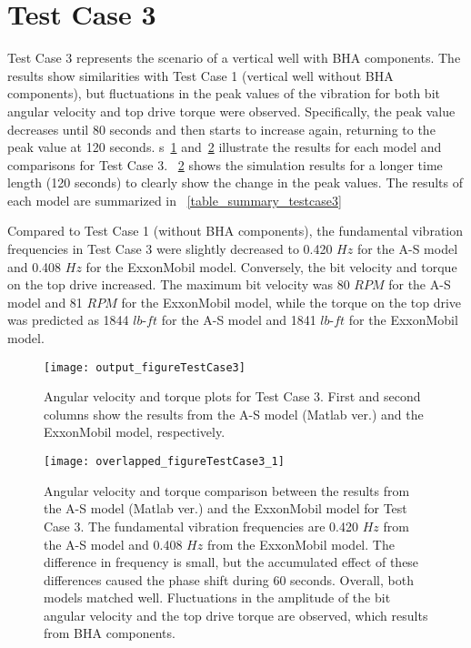 \section{Test Case 3}
 Test Case 3 represents the scenario of a vertical well with BHA components. The results show similarities with Test Case 1 (vertical well without BHA components), but fluctuations in the peak values of the vibration for both bit angular velocity and top drive torque were observed. Specifically, the peak value decreases until 80 seconds and then starts to increase again, returning to the peak value at 120 seconds. \figurename{}s~\ref{figure_testcase3} and~\ref{figure_testcase3_overlapped} illustrate the results for each model and comparisons for Test Case 3. \figurename~\ref{figure_testcase3_overlapped} shows the simulation results for a longer time length (120 seconds) to clearly show the change in the peak values. The results of each model are summarized in \tablename~\ref{table_summary_testcase3}

Compared to Test Case 1 (without BHA components), the fundamental vibration frequencies in Test Case 3 were slightly decreased to 0.420 $Hz$ for the A-S model and 0.408 $Hz$ for the ExxonMobil model. Conversely, the bit velocity and torque on the top drive increased. The maximum bit velocity was 80 $RPM$ for the A-S model and 81 $RPM$ for the ExxonMobil model, while the torque on the top drive was predicted as 1844 $lb\mbox{-}ft$ for the A-S model and 1841 $lb\mbox{-}ft$ for the ExxonMobil model.

\begin{figure}
  \centering
  \texttt{[image: output\_figureTestCase3]}
  \caption[Angular velocity and torque plots for Test Case 3]{Angular velocity and torque plots for Test Case 3. First and second columns show the results from the A-S model (Matlab ver.) and the ExxonMobil model, respectively.}\label{figure_testcase3}
\end{figure}
\begin{figure}
  \centering
  \texttt{[image: overlapped\_figureTestCase3\_1]}
  \caption[Angular velocity and torque comparison plots for Test Case 3]{Angular velocity and torque comparison between the results from the A-S model (Matlab ver.) and the ExxonMobil model for Test Case 3. The fundamental vibration frequencies are 0.420 $Hz$ from the A-S model and 0.408 $Hz$ from the ExxonMobil model. The difference in frequency is small, but the accumulated effect of these differences caused the phase shift during 60 seconds. Overall, both models matched well. Fluctuations in the amplitude of the bit angular velocity and the top drive torque are observed, which results from BHA components.}\label{figure_testcase3_overlapped}
\end{figure}

